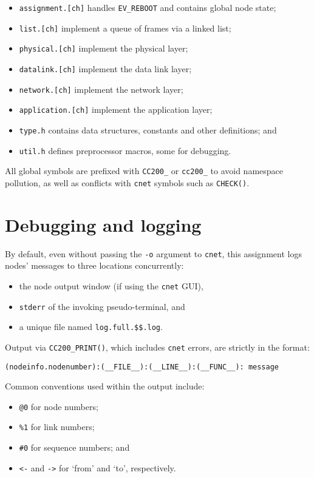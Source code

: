 \documentclass[a4paper,12pt,titlepage]{article}
\begin{document}
\begin{itemize}
	\item \texttt{assignment.[ch]} handles \texttt{EV\_REBOOT} and contains
	      global node state;
	\item \texttt{list.[ch]} implement a queue of frames via a linked list;
	\item \texttt{physical.[ch]} implement the physical layer;
	\item \texttt{datalink.[ch]} implement the data link layer;
	\item \texttt{network.[ch]} implement the network layer;
	\item \texttt{application.[ch]} implement the application layer;
	\item \texttt{type.h} contains data structures, constants and other
	      definitions; and
	\item \texttt{util.h} defines preprocessor macros, some for debugging.
\end{itemize}

All global symbols are prefixed with \texttt{CC200\_} or \texttt{cc200\_} to
avoid namespace pollution, as well as conflicts with \texttt{cnet} symbols such
as \texttt{CHECK()}.

\section{Debugging and logging}

By default, even without passing the \texttt{-o} argument to \texttt{cnet},
this assignment logs nodes' messages to three locations concurrently:

\begin{itemize}
	\item the node output window (if using the \texttt{cnet} GUI),
	\item \texttt{stderr} of the invoking pseudo-terminal, and
	\item a unique file named \texttt{log.full.\$\$.log}.
\end{itemize}

Output via \texttt{CC200\_PRINT()}, which includes \texttt{cnet} errors, are
strictly in the format:

\begin{lstlisting}
(nodeinfo.nodenumber):(__FILE__):(__LINE__):(__FUNC__): message
\end{lstlisting}

Common conventions used within the output include:

\begin{itemize}
	\item \texttt{@0} for node numbers;
	\item \texttt{\%1} for link numbers;
	\item \texttt{\#0} for sequence numbers; and
	\item \texttt{<-} and \texttt{->} for `from' and `to', respectively.
\end{itemize}
\end{document}
